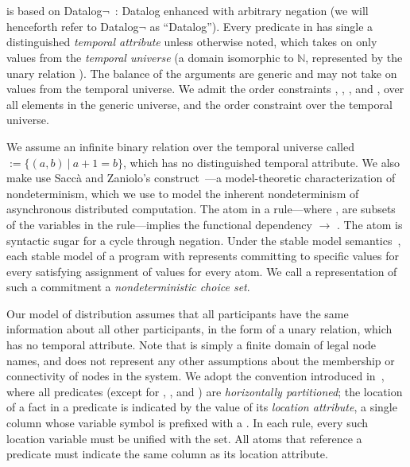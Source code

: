 \section{\large \bf \lang}
\label{sec:lang}

\lang is based on Datalog$\lnot$~\cite{ullmanbook}: Datalog enhanced with arbitrary negation (we will henceforth refer to Datalog$\lnot$ as ``Datalog'').  Every predicate in \lang has single a distinguished {\em temporal attribute} unless otherwise noted,
which takes on only values from the {\em temporal universe} (a domain isomorphic to $\mathbb{N}$,
represented by the unary relation ).
The balance of the arguments are generic and may not take on values from the temporal universe.  We admit the order constraints \dedalus{<}, \dedalus{=}, \dedalus{!=}, and \dedalus{<=}, over all elements in the generic universe, and the order constraint \dedalus{<} over the temporal universe.

We assume an infinite binary relation over the temporal universe
called  $:= \{(a,b) \ | \ a + 1 = b\}$, which has no distinguished temporal attribute.  We also make use Sacc\`{a} and Zaniolo's  construct~\cite{sacca-zaniolo}---a model-theoretic characterization of nondeterminism, which we use to model the inherent nondeterminism of asynchronous distributed computation.  The atom  in a rule---where ,  are subsets of the variables in the rule---implies the functional dependency  $\rightarrow$ .  The  atom is syntactic sugar for a cycle through negation.  Under the stable model semantics~\cite{stable-model}, each stable model of a program with  represents committing to specific  values for every satisfying assignment of  values for every  atom.  We call a representation of such a commitment a {\em nondeterministic choice set}.

Our model of distribution assumes that all participants have the same information about all other participants, in the form of a unary  relation, which has no temporal attribute. Note that  is simply a finite domain of legal node names, and does not represent any other assumptions about the membership or connectivity of nodes in the system. We adopt the convention introduced in~\cite{Loo:2005}, where all predicates (except for , , and ) are {\em horizontally partitioned};  the location of a fact in a predicate is indicated by the value of its {\em location attribute}, a single column whose variable symbol is prefixed with a \dedalus{\#}.  In each \lang rule, every such location variable must be unified with the  set.  All atoms that reference a predicate must indicate the same column as its location attribute.

